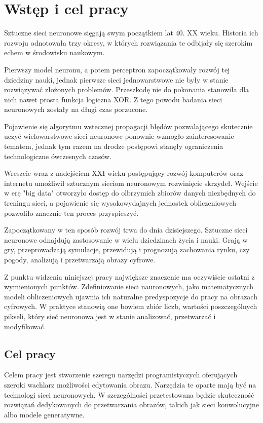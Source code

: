 \section{Wstęp i cel pracy}
  Sztuczne sieci neuronowe sięgają swym początkiem lat 40. XX wieku.
  Historia ich rozwoju odnotowała trzy okresy, w których rozwiązania te
  odbijały się szerokim echem w środowisku naukowym.

  Pierwszy model neuronu, a potem perceptron zapoczątkowały
  rozwój tej dziedziny nauki, jednak pierwsze sieci jednowarstwowe nie były w
  stanie rozwiązywać złożonych problemów. Przeszkodę nie do pokonania stanowiła
  dla nich nawet prosta funkcja logiczna XOR. Z tego powodu badania sieci
  neuronowych zostały na długi czas porzucone.


  Pojawienie się algorytmu wstecznej propagacji błędów
  pozwalającego skutecznie uczyć wielowarstwowe sieci neuronowe ponownie
  wzmogło zainteresowanie tematem, jednak tym razem na drodze postępowi stanęły
  ograniczenia technologiczne ówczesnych czasów.


  Wreszcie wraz z nadejściem XXI wieku postępujący rozwój
  komputerów oraz internetu umożliwił sztucznym sieciom neuronowym rozwinięcie
  skrzydeł. Wejście w erę "big data" otworzyło dostęp do olbrzymich zbiorów
  danych niezbędnych do treningu sieci, a pojawienie się wysokowydajnych
  jednostek obliczeniowych pozwoliło znacznie ten proces przyspieszyć.


  Zapoczątkowany w ten sposób rozwój trwa do dnia dzisiejszego.
  Sztuczne sieci neuronowe odnajdują zastosowanie w wielu dziedzinach życia i
  nauki. Grają w gry, przeprowadzają symulacje, przewidują i prognozują
  zachowania rynku, czy pogody, analizują i przetwarzają obrazy cyfrowe.


  Z punktu widzenia niniejszej pracy największe znaczenie ma
  oczywiście ostatni z wymienionych punktów. Zdefiniowanie sieci nauronowych,
  jako matematycznych modeli obliczeniowych ujawnia ich naturalne predyspozycje
  do pracy na obrazach cyfrowych. W praktyce stanowią one bowiem zbiór liczb,
  wartości poszczególnych pikseli, który sieć neuronowa jest w stanie
  analizować, przetwarzać i modyfikować.

  \subsection{Cel pracy}
    Celem pracy jest stworzenie szeregu narzędzi programistyczych
    oferujących szeroki wachlarz możliwości edytowania obrazu. Narzędzia te
    oparte mają być na technologi sieci neuronowych. W szczególności
    przetestowana będzie skuteczność rozwiązań dedykowanych do przetwarzania
    obrazów, takich jak sieci konwolucyjne albo modele generatywne.


